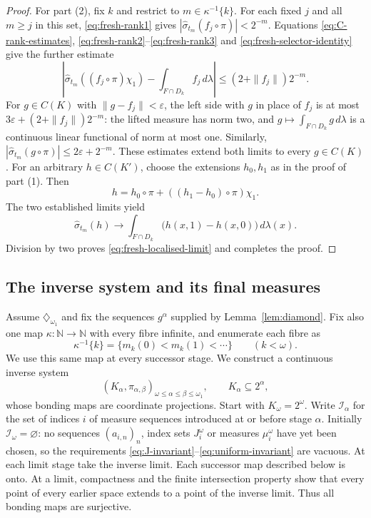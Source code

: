 \documentclass[a4paper,11pt]{amsart}
\theoremstyle{plain}
\theoremstyle{definition}
\theoremstyle{remark}
\newcommand{\N}{\mathbb N}
\newcommand{\eps}{\varepsilon}
\numberwithin{equation}{section}
\begin{document}
\begin{proof}
For part (2), fix $k$ and restrict to $m\in\kappa^{-1}\{k\}$.
For each fixed $j$ and all $m\geqslant j$ in this set,
\eqref{eq:fresh-rank1} gives
$|\widehat\sigma_{t_m}(f_j\circ\pi)|<2^{-m}$.
Equations \eqref{eq:C-rank-estimates},
\eqref{eq:fresh-rank2}--\eqref{eq:fresh-rank3} and
\eqref{eq:fresh-selector-identity} give the further estimate
\[
 \left|\widehat\sigma_{t_m}((f_j\circ\pi)\chi_1)
       -\int_{F\cap D_k}f_j\,d\lambda\right|
 \leqslant(2+\|f_j\|)2^{-m}.
\]
For $g\in C(K)$ with $\|g-f_j\|<\eps$, the left side with $g$
in place of $f_j$ is at most
$3\eps+(2+\|f_j\|)2^{-m}$: the lifted measure has norm two,
and $g\mapsto\int_{F\cap D_k}g\,d\lambda$ is a continuous linear
functional of norm at most one. Similarly,
$|\widehat\sigma_{t_m}(g\circ\pi)|\leqslant2\eps+2^{-m}$.
These estimates extend both limits to every $g\in C(K)$.
For an arbitrary $h\in C(K')$, choose the extensions $h_0,h_1$
as in the proof of part (1). Then
\[
 h=h_0\circ\pi+((h_1-h_0)\circ\pi)\chi_1.
\]
The two established limits yield
\[
 \widehat\sigma_{t_m}(h)\longrightarrow
 \int_{F\cap D_k}\bigl(h(x,1)-h(x,0)\bigr)\,d\lambda(x).
\]
Division by two proves \eqref{eq:fresh-localised-limit} and completes
the proof.
\end{proof}

\subsection{The inverse system and its final measures}\label{subsec:recursion}

Assume $\diamondsuit_{\omega_1}$ and fix the sequences $g^\alpha$
supplied by Lemma~\ref{lem:diamond}. Fix also one map
$\kappa:\N\to\N$ with every fibre infinite, and enumerate each fibre as
\[
 \kappa^{-1}\{k\}=\{m_k(0)<m_k(1)<\cdots\}\qquad(k<\omega).
\]
We use this same map at every successor stage.
We construct a continuous inverse system
\[
 (K_\alpha,\pi_{\alpha,\beta})_{
 \omega\leqslant\alpha\leqslant\beta\leqslant\omega_1},
 \qquad K_\alpha\subseteq2^\alpha,
\]
whose bonding maps are coordinate projections.  Start with $K_\omega=2^\omega$.  Write $\mathcal I_\alpha$ for the set of indices $i$ of measure sequences introduced at or before stage $\alpha$.  Initially $\mathcal I_\omega=\varnothing$: no sequences $(a_{i,n})_n$, index sets $J_i^\omega$ or measures $\mu_i^\omega$ have yet been chosen, so the requirements \eqref{eq:J-invariant}--\eqref{eq:uniform-invariant} are vacuous.  At each limit stage take the inverse limit.  Each successor map described below is onto.  At a limit, compactness and the finite intersection property show that every point of every earlier space extends to a point of the inverse limit.  Thus all bonding maps are surjective.
\end{document}
